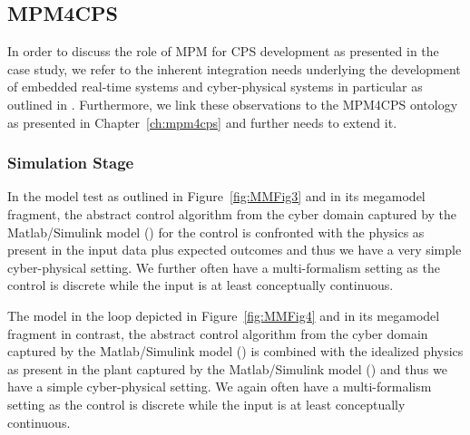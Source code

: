 \subsection{MPM4CPS}\label{subsec:cpslab-mpm4cps}
%
In order to discuss the role of MPM for CPS development as presented in the case study, we refer to the inherent integration needs underlying the development of embedded real-time systems and cyber-physical systems in particular as outlined in \cite{GieseNNS2011}. Furthermore, we link these observations to the MPM4CPS ontology as presented in Chapter~\ref{ch:mpm4cps} and further needs to extend it.

\subsubsection{Simulation Stage}
%
%
In the model test as outlined in Figure~\ref{fig:MMFig3} and in its megamodel fragment, the abstract control algorithm from the cyber domain captured by the Matlab/Simulink model (\CPSLabControlModel) for the control is confronted with the physics as present in the input data plus expected outcomes and thus we have a very simple cyber-physical setting. We further often have a multi-formalism setting as the control is discrete while the input is at least conceptually continuous. 


%
The model in the loop depicted in Figure~\ref{fig:MMFig4} and in its megamodel fragment in contrast, the abstract control algorithm from the cyber domain captured by the Matlab/Simulink model (\CPSLabControlModel) is combined with the idealized physics as present in the plant captured by the Matlab/Simulink model (\CPSLabPlantModel) and thus we have a simple cyber-physical setting. We again often have a multi-formalism setting as the control is discrete while the input is at least conceptually continuous. 



